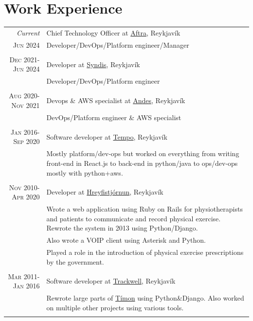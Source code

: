 \documentclass[a4paper,10pt]{article}
\begin{document}
\section{Work Experience}
\begin{tabular}{r|p{10cm}}
 \emph{Current} & Chief Technology Officer at \href{www.aftra.io}{Aftra}, Reykjavík \\\textsc{Jun 2024}&\footnotesize{Developer/DevOps/Platform engineer/Manager}\\\multicolumn{2}{c}{} \\
 \textsc{Dec 2021-Jun 2024} & Developer at \href{www.syndis.is}{Syndis}, Reykjavík \\&\footnotesize{Developer/DevOps/Platform engineer}\\\multicolumn{2}{c}{} \\
 \textsc{Aug 2020-Nov 2021} & Devops \& AWS specialist at \href{www.andes.is}{Andes}, Reykjavík \\&\footnotesize{DevOps/Platform engineer \& AWS specialist}\\\multicolumn{2}{c}{} \\
 \textsc{Jan 2016-Sep 2020} & Software developer at \href{www.tempo.io}{Tempo}, Reykjavík \\&\footnotesize{Mostly platform/dev-ops but worked on everything from writing front-end in React.js to back-end in python/java to ops/dev-ops mostly with python+aws.}\\\multicolumn{2}{c}{} \\

 \textsc{Nov 2010-Apr 2020} & Developer at \href{www.hreyfistjornun.is}{Hreyfistjórnun}, Reykjavík \\&\footnotesize{Wrote a web application using Ruby on Rails for physiotherapists and patients to communicate and record physical exercise. Rewrote the
system in 2013 using Python/Django.}\\
& \footnotesize{Also wrote a VOIP client using Asterisk and Python.}\\
& \footnotesize{Played a role in the introduction of physical exercise
prescriptions by the government.}\\\multicolumn{2}{c}{} \\

 \textsc{Mar 2011-Jan 2016} & Software developer at \href{www.trackwell.com}{Trackwell}, Reykjavík \\&\footnotesize{Rewrote large parts of \href{www.timon.is}{Tímon} using Python\&Django. Also worked on multiple other projects using various tools.}\\\multicolumn{2}{c}{} \\


\end{tabular}
\end{document}
